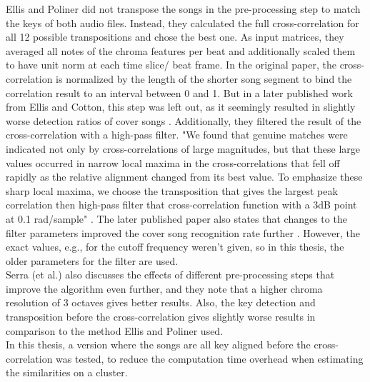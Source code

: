 Ellis and Poliner did not transpose the songs in the pre-processing step to match the keys of both audio files. Instead, they calculated the full cross-correlation for all 12 possible transpositions and chose the best one. 
As input matrices, they averaged all notes of the chroma features per beat and additionally scaled them to have unit norm at each time slice/ beat frame.
In the original paper, the cross-correlation is normalized by the length of the shorter song segment to bind the correlation result to an interval between 0 and 1. But in a later published work from Ellis and Cotton, this step was left out, as it seemingly resulted in slightly worse detection ratios of cover songs \cite{cover802}. 
Additionally, they filtered the result of the cross-correlation with a high-pass filter. "We found that genuine matches were indicated not only by cross-correlations of large magnitudes, but that these large values occurred in narrow local maxima in the cross-correlations that fell off rapidly as the relative alignment changed from its best value. To emphasize these sharp local maxima, we choose the transposition that gives the largest peak correlation then high-pass filter that cross-correlation function with a 3dB point at 0.1 rad/sample" \cite[p. 3]{chroma3}. The later published paper also states that changes to the filter parameters improved the cover song recognition rate further \cite{cover802}. However, the exact values, e.g., for the cutoff frequency weren't given, so in this thesis, the older parameters for the filter are used.\\
Serra (et al.) also discusses the effects of different pre-processing steps that improve the algorithm even further, and they note that a higher chroma resolution of 3 octaves gives better results. Also, the key detection and transposition before the cross-correlation gives slightly worse results in comparison to the method Ellis and Poliner used.\\ 
In this thesis, a version where the songs are all key aligned before the cross-correlation was tested, to reduce the computation time overhead when estimating the similarities on a cluster. 
